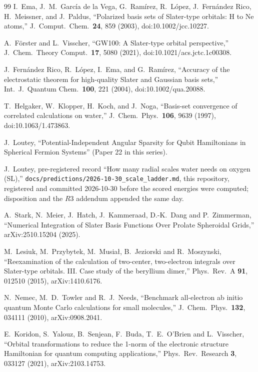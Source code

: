 \documentclass[aps,pra,twocolumn,superscriptaddress,longbibliography]{revtex4-2}
\begin{document}
\begin{thebibliography}{99}
I.~Ema, J.~M.~Garc\'ia de la Vega, G.~Ram\'irez, R.~L\'opez,
J.~Fern\'andez Rico, H.~Meissner, and J.~Paldus, ``Polarized basis sets of
Slater-type orbitals: H to Ne atoms,'' J.\ Comput.\ Chem.\ \textbf{24},
859 (2003), doi:10.1002/jcc.10227.

A.~F\"orster and L.~Visscher, ``GW100: A Slater-type orbital perspective,''
J.\ Chem.\ Theory Comput.\ \textbf{17}, 5080 (2021),
doi:10.1021/acs.jctc.1c00308.

J.~Fern\'andez Rico, R.~L\'opez, I.~Ema, and G.~Ram\'irez, ``Accuracy of the
electrostatic theorem for high-quality Slater and Gaussian basis sets,'' Int.\ J.\ Quantum
Chem.\ \textbf{100}, 221 (2004), doi:10.1002/qua.20088.

T.~Helgaker, W.~Klopper, H.~Koch, and J.~Noga, ``Basis-set convergence of
correlated calculations on water,'' J.\ Chem.\ Phys.\ \textbf{106}, 9639
(1997), doi:10.1063/1.473863.

J.~Loutey, ``Potential-Independent Angular Sparsity for Qubit Hamiltonians in Spherical Fermion Systems'' (Paper 22 in this series).

J.~Loutey, pre-registered record ``How many radial scales water needs on
oxygen (SL),'' \texttt{docs/predictions/2026-10-30\_scale\_ladder.md}, this
repository, registered and committed 2026-10-30 before the scored
energies were computed; disposition and the $R3$ addendum appended the
same day.

A.~Stark, N.~Meier, J.~Hatch, J.~Kammeraad, D.-K.~Dang and
P.~Zimmerman, ``Numerical Integration of Slater Basis Functions Over
Prolate Spheroidal Grids,'' arXiv:2510.15204 (2025).

M.~Lesiuk, M.~Przybytek, M.~Musia\l, B.~Jeziorski and R.~Moszynski,
``Reexamination of the calculation of two-center, two-electron integrals
over Slater-type orbitals. III. Case study of the beryllium dimer,''
Phys.\ Rev.\ A \textbf{91}, 012510 (2015), arXiv:1410.6176.

N.~Nemec, M.~D.~Towler and R.~J.~Needs, ``Benchmark all-electron
ab initio quantum Monte Carlo calculations for small molecules,''
J.\ Chem.\ Phys.\ \textbf{132}, 034111 (2010), arXiv:0908.2041.

E.~Koridon, S.~Yalouz, B.~Senjean, F.~Buda, T.~E.~O'Brien and
L.~Visscher, ``Orbital transformations to reduce the 1-norm of the
electronic structure Hamiltonian for quantum computing applications,''
Phys.\ Rev.\ Research \textbf{3}, 033127 (2021), arXiv:2103.14753.


\end{thebibliography}
\end{document}
